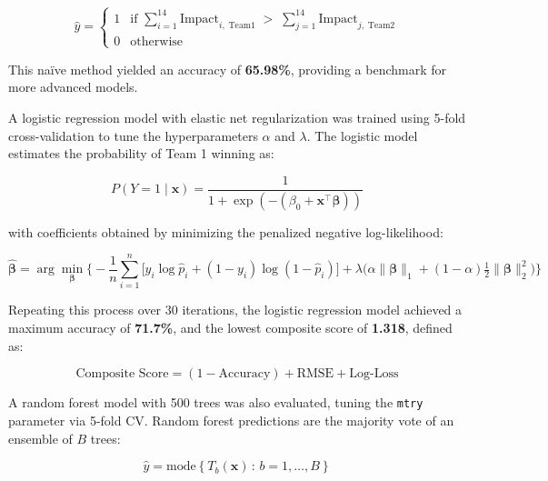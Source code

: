 \documentclass{article}[12pt]
\begin{document}
\begin{equation}
\hat{y} =
\begin{cases}
1 & \text{if } \sum_{i=1}^{14} \text{Impact}_{i,\;\text{Team1}} \; > \; \sum_{j=1}^{14} \text{Impact}_{j,\;\text{Team2}} \\
0 & \text{otherwise}
\end{cases}
\end{equation}

This naïve method yielded an accuracy of \textbf{65.98\%}, providing a benchmark for more advanced models.  

A logistic regression model with elastic net regularization was trained using 5-fold cross-validation to tune the hyperparameters $\alpha$ and $\lambda$. \parencite{glmnet} The logistic model estimates the probability of Team 1 winning as:  

\begin{equation}
P(Y = 1 \mid \mathbf{x}) = \frac{1}{1 + \exp(-(\beta_0 + \mathbf{x}^\top \boldsymbol{\beta}))}
\end{equation}

with coefficients obtained by minimizing the penalized negative log-likelihood:  

\begin{equation}
\hat{\boldsymbol{\beta}} = \arg\min_{\boldsymbol{\beta}}
\Bigg\{
 - \frac{1}{n} \sum_{i=1}^{n} \Big[ y_i \log \hat{p}_i + (1-y_i) \log (1 - \hat{p}_i) \Big]
 + \lambda \Big( \alpha \|\boldsymbol{\beta}\|_1 + (1-\alpha)\tfrac{1}{2}\|\boldsymbol{\beta}\|_2^2 \Big)
\Bigg\}
\end{equation}

Repeating this process over 30 iterations, the logistic regression model achieved a maximum accuracy of \textbf{71.7\%}, and the lowest composite score of \textbf{1.318}, defined as:  

\begin{equation}
\text{Composite Score} = (1 - \text{Accuracy}) + \text{RMSE} + \text{Log-Loss}
\end{equation}

A random forest model with 500 trees was also evaluated, tuning the \texttt{mtry} parameter via 5-fold CV. \parencite{kuhn_2008_building}  Random forest predictions are the majority vote of an ensemble of $B$ trees:  

\begin{equation}
\hat{y} = \mathrm{mode}\left\{ T_b(\mathbf{x}) \,:\, b = 1, \dots, B \right\}
\end{equation}
\end{document}
